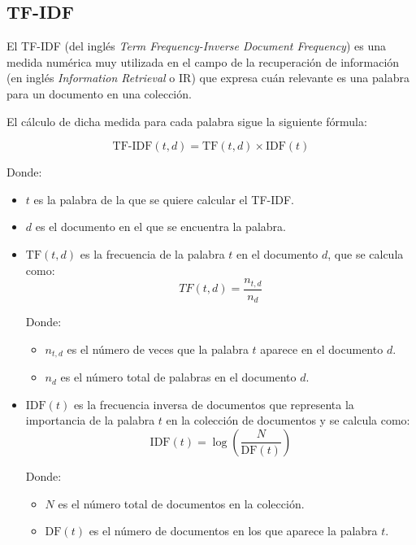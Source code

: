 \subsection{TF-IDF}
El TF-IDF (del inglés \textit{Term Frequency-Inverse Document Frequency}) es una medida numérica muy utilizada en el campo de la recuperación de información 
(en inglés \textit{Information Retrieval} o IR) que expresa cuán relevante es una palabra para un documento en una colección.

\bigskip
El cálculo de dicha medida para cada palabra sigue la siguiente fórmula:

\begin{equation}
		\label{eq:tfidf}
		\text{TF-IDF}(t,d) = \text{TF}(t,d) \times \text{IDF}(t)
\end{equation}

Donde:
\begin{itemize}
	\item $t$ es la palabra de la que se quiere calcular el TF-IDF.
	\item $d$ es el documento en el que se encuentra la palabra.
	\item $\text{TF}(t,d)$ es la frecuencia de la palabra $t$ en el documento $d$, que se calcula como:
		\begin{equation}
				\label{eq:tf}
				TF(t,d) = \frac{n_{t,d}}{n_d}
		\end{equation}

		Donde:
		\begin{itemize}
				\item $n_{t,d}$ es el número de veces que la palabra $t$ aparece en el documento $d$.
				\item $n_d$ es el número total de palabras en el documento $d$.
		\end{itemize}

	\item $\text{IDF}(t)$ es la frecuencia inversa de documentos que representa la importancia de la palabra $t$ en la colección de documentos y
		se calcula como:
		\begin{equation}
			\label{eq:idf}
			\text{IDF}(t) = \log \left(\frac{N}{\text{DF}(t)}\right)
		\end{equation}

		Donde:
		\begin{itemize}
				\item $N$ es el número total de documentos en la colección.
				\item $\text{DF}(t)$ es el número de documentos en los que aparece la palabra $t$.
		\end{itemize}
\end{itemize}

